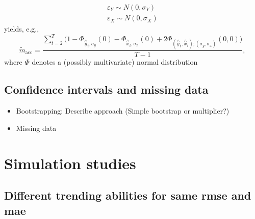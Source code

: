 \documentclass[oneside]{article}
\theoremstyle{plain}%
\theoremstyle{definition}
\newcommand{\ydiff}{\overset{\triangle}{y}}
\newcommand{\xdiff}{\overset{\triangle}{x}}
\newcommand{\mprob}{\tilde{m}}
\begin{document}
\begin{itemize}
\begin{itemize}
  \begin{align}
	  \varepsilon_Y \sim N(0, \sigma_Y) \\
	  \varepsilon_X \sim N(0, \sigma_X)
  \end{align}
  yields, e.g.,
  	\begin{equation}
  		\mprob_{\text{acc}} = \frac{\sum_{t=2}^T  \big( 1 - \Phi_{\ydiff_t, \sigma_y}(0) - \Phi_{\xdiff_t, \sigma_x} (0) + 2 \Phi_{(\ydiff_t, \xdiff_t); (\sigma_y, \sigma_x)}( 0, 0) \big) }{T-1}, 
	\end{equation}
	where $\Phi$ denotes a (possibly multivariate) normal distribution
\end{itemize}
\end{itemize}


\subsection{Confidence intervals and missing data}

\begin{itemize}
  \item Bootstrapping: Describe approach (Simple bootstrap or multiplier?)
  \item Missing data
\end{itemize}


\section{Simulation studies}

\subsection{Different trending abilities for same rmse and mae} \label{sec:simulation_rmse_mae}
\end{document}
